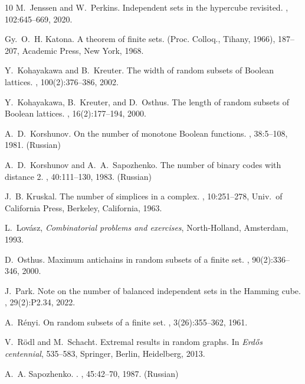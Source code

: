 \documentclass[12pt]{article}
\begin{document}
\begin{thebibliography}{10}
M.~Jenssen and W.~Perkins.
\newblock Independent sets in the hypercube revisited.
, 102:645--669, 2020.

Gy.~O.~H. Katona.
\newblock A theorem of finite sets.
 (Proc. Colloq., Tihany, 1966), 187--207, Academic Press, New York, 1968.

Y.~Kohayakawa and B.~Kreuter.
\newblock The width of random subsets of {B}oolean lattices.
, 100(2):376--386,
  2002.

Y.~Kohayakawa, B.~Kreuter, and D.~Osthus.
\newblock The length of random subsets of {B}oolean lattices.
, 16(2):177--194, 2000.

A.~D.~Korshunov.
\newblock On the number of monotone Boolean functions.
, 38:5--108, 1981. (Russian)

A.~D.~Korshunov and A.~A.~Sapozhenko.
\newblock The number of binary codes with distance 2.
, 40:111--130, 1983. (Russian)

J.~B. Kruskal.
\newblock The number of simplices in a complex.
, 10:251--278, Univ.~of California Press, Berkeley, California, 1963.

L.~Lov{\'a}sz, \emph{Combinatorial problems and exercises}, North-Holland,
  Amsterdam, 1993.

D.~Osthus.
\newblock Maximum antichains in random subsets of a finite set.
, 90(2):336--346,
  2000.

J.~Park.
\newblock Note on the number of balanced independent sets in the {H}amming cube.
, 29(2):P2.34, 2022.

A.~R{\'e}nyi.
\newblock On random subsets of a finite set.
, 3(26):355--362, 1961.

V.~R{\"o}dl and M.~Schacht.
\newblock Extremal results in random graphs.
\newblock In {\em Erd{\H{o}}s centennial}, 535--583, Springer, Berlin, Heidelberg, 2013.

A.~A. {Sapozhenko}.
.
, 45:42--70, 1987. (Russian)


\end{thebibliography}
\end{document}
